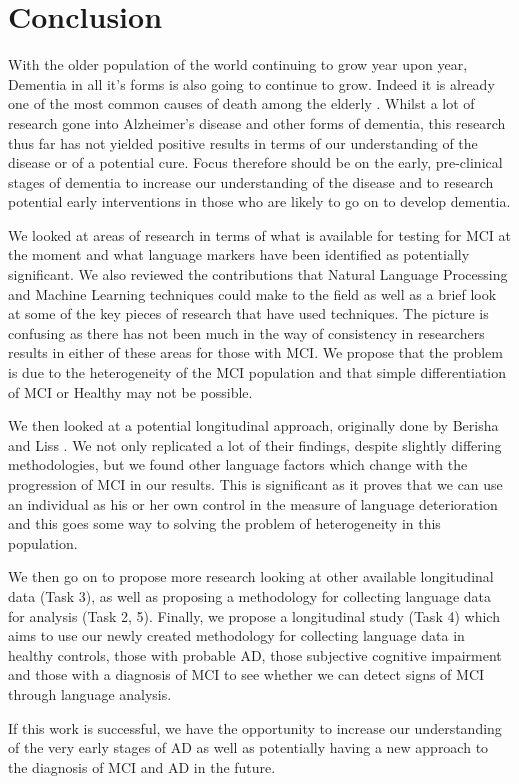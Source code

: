 \documentclass[10pt, letterpaper, twoside, openany]{book}
\begin{document}
\chapter{Conclusion}
With the older population of the world continuing to grow year upon year, Dementia in all it's forms is also going to continue to grow. Indeed it is already one of the most common causes of death among the elderly \cite{Prince2015}. Whilst a lot of research gone into Alzheimer's disease and other forms of dementia, this research thus far has not yielded positive results in terms of our understanding of the disease or of a potential cure. Focus therefore should be on the early, pre-clinical stages of dementia to increase our understanding of the disease and to research potential early interventions in those who are likely to go on to develop dementia.
\par 
We looked at areas of research in terms of what is available for testing for MCI at the moment and what language markers have been identified as potentially significant. We also reviewed the contributions that Natural Language Processing and Machine Learning techniques could make to the field as well as a brief look at some of the key pieces of research that have used techniques. The picture is confusing as there has not been much in the way of consistency in researchers results in either of these areas for those with MCI. We propose that the problem is due to the heterogeneity of the MCI population and that simple differentiation of MCI or Healthy may not be possible.
\par 
We then looked at a potential longitudinal approach, originally done by Berisha and Liss \cite{Berisha2015}. We not only replicated a lot of their findings, despite slightly differing methodologies, but we found other language factors which change with the progression of MCI in our results. This is significant as it proves that we can use an individual as his or her own control in the measure of language deterioration and this goes some way to solving the problem of heterogeneity in this population.
\par
We then go on to propose more research looking at other available longitudinal data (Task 3), as well as proposing a methodology for collecting language data for analysis (Task 2, 5). Finally, we propose a longitudinal study (Task 4) which aims to use our newly created methodology for collecting language data in healthy controls, those with probable AD, those subjective cognitive impairment and those with a diagnosis of MCI to see whether we can detect signs of MCI through language analysis.
\par
If this work is successful, we have the opportunity to increase our understanding of the very early stages of AD as well as potentially having a new approach to the diagnosis of MCI and AD in the future. 



\end{document}
